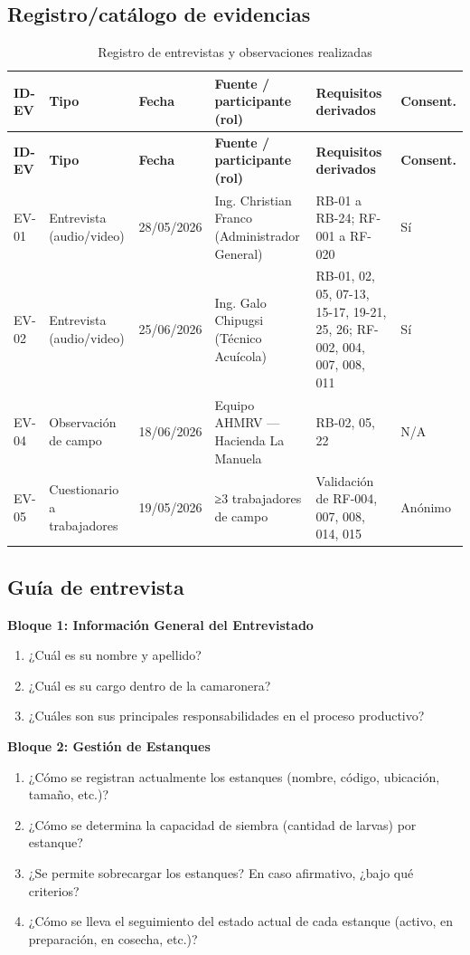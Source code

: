 \documentclass[11pt,a4paper]{article}
\begin{document}
\subsection{Registro/catálogo de evidencias}
\begin{longtable}{|p{1.5cm}|p{2.5cm}|p{2cm}|p{3.5cm}|p{3cm}|p{1.9cm}|}
\caption{Registro de entrevistas y observaciones realizadas}
\label{tab:registro-entrevistas}
\hline
\textbf{ID-EV} & \textbf{Tipo} & \textbf{Fecha} & \textbf{Fuente / participante (rol)} & \textbf{Requisitos derivados} & \textbf{Consent.} \\
\hline
\endfirsthead
\hline
\textbf{ID-EV} & \textbf{Tipo} & \textbf{Fecha} & \textbf{Fuente / participante (rol)} & \textbf{Requisitos derivados} & \textbf{Consent.} \\
\hline
\endhead
EV-01 & Entrevista (audio/video) & 28/05/2026 & Ing. Christian Franco (Administrador General) & RB-01 a RB-24; RF-001 a RF-020 & Sí \\
\hline
EV-02 & Entrevista (audio/video) & 25/06/2026 & Ing. Galo Chipugsi (Técnico Acuícola) & RB-01, 02, 05, 07-13, 15-17, 19-21, 25, 26; RF-002, 004, 007, 008, 011 & Sí \\
\hline
EV-04 & Observación de campo & 18/06/2026 & Equipo AHMRV — Hacienda La Manuela & RB-02, 05, 22 & N/A \\
\hline
EV-05 & Cuestionario a trabajadores & 19/05/2026 & ≥3 trabajadores de campo & Validación de RF-004, 007, 008, 014, 015 & Anónimo \\
\hline
\end{longtable}

\subsection{Guía de entrevista}
\bigskip
\noindent\textbf{Bloque 1: Información General del Entrevistado}
\begin{enumerate}
  \item ¿Cuál es su nombre y apellido?
  \item ¿Cuál es su cargo dentro de la camaronera?
  \item ¿Cuáles son sus principales responsabilidades en el proceso productivo?
\end{enumerate}

\noindent\textbf{Bloque 2: Gestión de Estanques}
\begin{enumerate}[resume]
  \item ¿Cómo se registran actualmente los estanques (nombre, código, ubicación, tamaño, etc.)?
  \item ¿Cómo se determina la capacidad de siembra (cantidad de larvas) por estanque?
  \item ¿Se permite sobrecargar los estanques? En caso afirmativo, ¿bajo qué criterios?
  \item ¿Cómo se lleva el seguimiento del estado actual de cada estanque (activo, en preparación,
    en cosecha, etc.)?
\end{enumerate}
\end{document}
